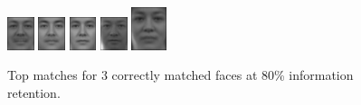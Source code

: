 \begin{figure}[hbt]
  \includegraphics[width=0.07\textwidth]{../results/H_rez/correct80/3/6.jpg}
  \includegraphics[width=0.07\textwidth]{../results/H_rez/correct80/3/7.jpg}
  \includegraphics[width=0.07\textwidth]{../results/H_rez/correct80/3/8.jpg}
  \includegraphics[width=0.07\textwidth]{../results/H_rez/correct80/3/9.jpg}
  \includegraphics[width=0.09\textwidth]{../results/H_rez/correct80/3/10.jpg}
  \caption{Top matches for 3 correctly matched faces at 80\% information retention.}
  \label{fig:correct80}
\end{figure}

~\vfill

